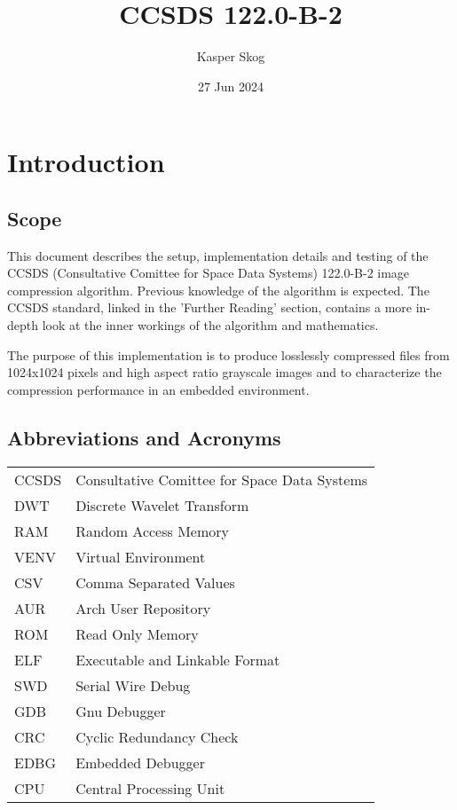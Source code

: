 \documentclass[12pt, a4paper]{article}
\title{CCSDS 122.0-B-2}
\author{Kasper Skog}
\date{27 Jun 2024}
\begin{document}
\maketitle
\newpage
\tableofcontents

\newpage
\section{Introduction}
\subsection{Scope}
This document describes the setup, implementation details and testing of the 
CCSDS (Consultative Comittee for Space Data Systems) 122.0-B-2 image compression algorithm. 
Previous knowledge of the algorithm is expected. 
The CCSDS standard, linked in the 'Further Reading' section, 
contains a more in-depth look at the inner workings of the algorithm and mathematics.

\medskip
\noindent
The purpose of this implementation is to produce losslessly compressed files from 
1024x1024 pixels and high aspect ratio grayscale images and to characterize the compression performance in an embedded environment. 

\subsection{Abbreviations and Acronyms}
\begin{tabular}{ll}
    CCSDS   & Consultative Comittee for Space Data Systems \\
    DWT     & Discrete Wavelet Transform \\
    RAM     & Random Access Memory \\
    VENV    & Virtual Environment \\
    CSV     & Comma Separated Values \\
    AUR     & Arch User Repository \\
    ROM     & Read Only Memory \\
    ELF     & Executable and Linkable Format \\
    SWD     & Serial Wire Debug \\
    GDB     & Gnu Debugger \\
    CRC     & Cyclic Redundancy Check \\
    EDBG    & Embedded Debugger \\
    CPU     & Central Processing Unit \\
\end{tabular}
\end{document}
